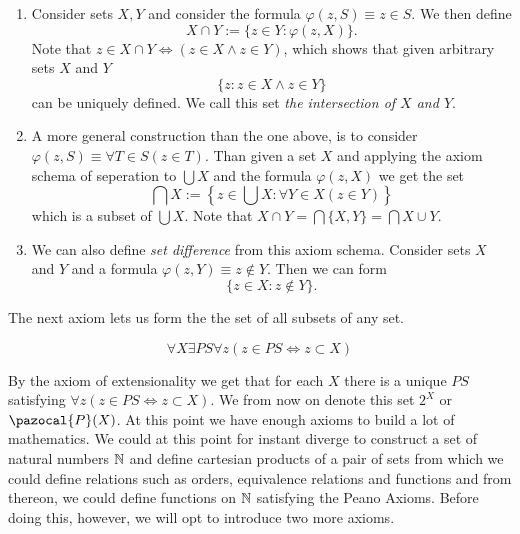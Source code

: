 \begin{example}
    \begin{enumerate}
        \item Consider sets $X,Y$ and consider the formula $\varphi(z,S) \equiv z\in S$. We then define 
        $$X\cap Y := \{ z\in Y : \varphi(z,X)\}.$$
        Note that $z\in X\cap Y\iff (z\in X\wedge z\in Y)$, which shows that given arbitrary sets $X$ and $Y$
        $$\{z : z\in X\wedge z\in Y\}$$
        can be uniquely defined. We call this set \textit{the intersection of $X$ and $Y$}.
        \item A more general construction than the one above, is to consider $\varphi(z,S) \equiv \forall T\in S(z\in T)$. Than given a set $X$ and applying the axiom schema of seperation to $\bigcup X$ and the formula $\varphi(z,X)$ we get the set 
        $$ \bigcap X := \left\{z \in \bigcup X : \forall Y \in X(z\in Y)\right\}$$
        which is a subset of $\bigcup X$. Note that $X\cap Y = \bigcap\{X, Y\} = \bigcap X\cup Y$.
        \item We can also define \textit{set difference}  from this axiom schema. Consider sets $X$ and $Y$ and a formula $\varphi(z,Y) \equiv z\notin Y$. Then we can form
        $$ \{z\in X : z\notin Y\}.$$
    \end{enumerate}
\end{example}
The next axiom lets us form the the set of all subsets of any set. 
\begin{axioms}
    $$\forall X\exists PS\forall z(z\in PS\iff z \subset X)$$
\end{axioms}
By the axiom of extensionality we get that for each $X$ there is a unique $PS$ satisfying $\forall z(z \in PS \iff z\subset X)$. We from now on denote this set $2^X$ or $\pazocal{P}(X)$. At this point we have enough axioms to build a lot of mathematics. We could at this point for instant diverge to construct a set of natural numbers $\mathbb{N}$ and define cartesian products of a pair of sets from which we could define relations such as orders, equivalence relations and functions and from thereon, we could define functions on $\mathbb{N}$ satisfying the Peano Axioms. Before doing this, however, we will opt to introduce two more axioms.
